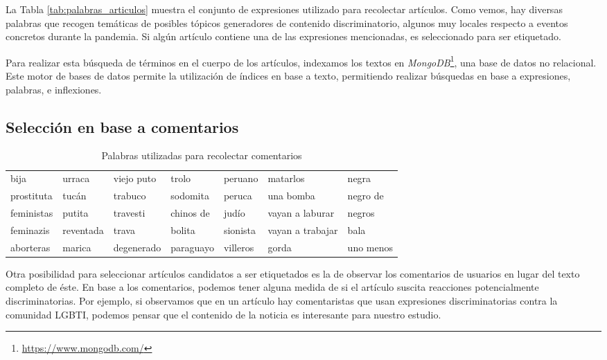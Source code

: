 La Tabla \ref{tab:palabras_articulos} muestra el conjunto de expresiones utilizado para recolectar artículos. Como vemos, hay diversas palabras que recogen temáticas de posibles tópicos generadores de contenido discriminatorio, algunos muy locales respecto a eventos concretos durante la pandemia. Si algún artículo contiene una de las expresiones mencionadas, es seleccionado para ser etiquetado.

Para realizar esta búsqueda de términos en el cuerpo de los artículos, indexamos los textos en \emph{MongoDB}\footnote{\url{https://www.mongodb.com/}}, una base de datos no relacional. Este motor de bases de datos permite la utilización de índices en base a texto, permitiendo realizar búsquedas en base a expresiones, palabras, e inflexiones.



\subsection{Selección en base a comentarios}
\label{subsec:seleccion_comentarios}


\begin{table*}[h]
    \centering
    \small
    \begin{tabular}{l l l l l l l}
    \hline
    bija          & urraca     & viejo puto    & trolo      & peruano  & matarlos         & negra      \\
    prostituta    & tucán      & trabuco       & sodomita   & peruca   & una bomba        & negro de   \\
    feministas    & putita     & travesti      & chinos de  & judío    & vayan a laburar  & negros     \\
    feminazis     & reventada  & trava         & bolita     & sionista & vayan a trabajar & bala       \\
    aborteras     & marica     & degenerado    & paraguayo  & villeros & gorda            & uno menos  \\
    \hline
    \end{tabular}
    \caption{Palabras utilizadas para recolectar comentarios}
    \label{tab:palabras_comentarios}
\end{table*}

Otra posibilidad para seleccionar artículos candidatos a ser etiquetados es la de observar los comentarios de usuarios en lugar del texto completo de éste. En base a los comentarios, podemos tener alguna medida de si el artículo suscita reacciones potencialmente discriminatorias. Por ejemplo, si observamos que en un artículo hay comentaristas que usan expresiones discriminatorias contra la comunidad LGBTI, podemos pensar que el contenido de la noticia es interesante para nuestro estudio.

